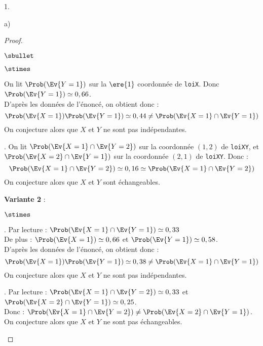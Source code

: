 \documentclass[11pt]{article}%
\begin{document}
\begin{noliste}{1.}
\begin{noliste}{a)}
\begin{proof}
\begin{noliste}{$\sbullet$}
\begin{noliste}{$\stimes$}

    
    On lit $\Prob(\Ev{Y=1})$ sur la $\ere{1}$ coordonnée de 
    \texttt{loiX}. Donc $\Prob(\Ev{Y=1}) \simeq 0,66$.\\[.2cm]
    D'après les données de l'énoncé, on obtient donc :
    \[
     \Prob(\Ev{X=1}) \Prob(\Ev{Y=1}) \simeq 0,44 \neq 
     \Prob(\Ev{X=1} \cap \Ev{Y=1})
    \]
    On conjecture alors que $X$ et $Y$ ne sont pas indépendantes.
    
    \item {}.
    On lit $\Prob(\Ev{X=1} \cap \Ev{Y=2})$ sur la coordonnée $(1,2)$ 
    de \texttt{loiXY}, et \\[.2cm]
    $\Prob(\Ev{X=2} \cap \Ev{Y=1})$ sur la 
    coordonnée $(2,1)$ de \texttt{loiXY}. Donc :
    \[
     \Prob(\Ev{X=1} \cap \Ev{Y=2}) \simeq 
    0,16 \simeq \Prob(\Ev{X=1} \cap \Ev{Y=2})
    \]
    On conjecture alors que $X$ et $Y$ sont échangeables.
    \end{noliste}
    
    \item {\bf Variante 2} :
    \begin{noliste}{$\stimes$}
    \item {}. Par lecture : $\Prob(\Ev{X=1} \cap 
    \Ev{Y=1}) \simeq 0,33$\\[.2cm]
    De plus : $\Prob(\Ev{X=1}) \simeq 0,66$ et $\Prob(\Ev{Y=1}) \simeq 
    0,58$.\\[.2cm]
    D'après les données de l'énoncé, on obtient donc :
    \[
     \Prob(\Ev{X=1}) \Prob(\Ev{Y=1}) \simeq 0,38 \neq 
     \Prob(\Ev{X=1} \cap \Ev{Y=1})
    \]
    On conjecture alors que $X$ et $Y$ ne sont pas indépendantes.
    
    \item {}. Par lecture :
    $\Prob(\Ev{X=1}\cap \Ev{Y=2}) \simeq 0,33$ et
    $\Prob(\Ev{X=2} \cap \Ev{Y=1}) \simeq 0,25$.\\[.2cm]
    Donc : $\Prob(\Ev{X=1}\cap \Ev{Y=2}) \neq 
    \Prob(\Ev{X=2}\cap \Ev{Y=1})$.\\[.2cm]
    On conjecture alors que $X$ et $Y$ ne sont pas échangeables.
    \end{noliste}
    

\end{noliste}
\end{proof}
\end{noliste}
\end{noliste}
\end{document}

